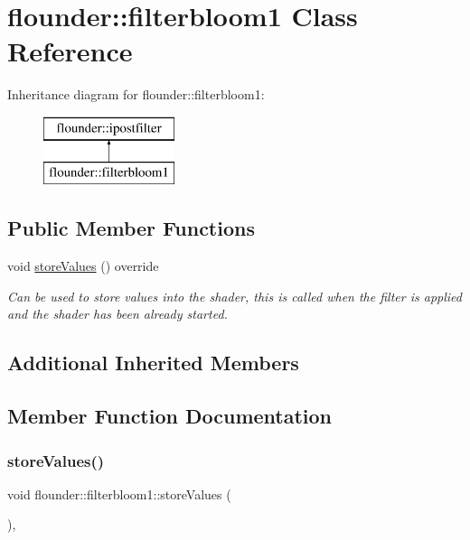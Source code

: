 \hypertarget{classflounder_1_1filterbloom1}{}\section{flounder\+:\+:filterbloom1 Class Reference}
\label{classflounder_1_1filterbloom1}
Inheritance diagram for flounder\+:\+:filterbloom1\+:\begin{figure}[H]
\begin{center}
\leavevmode
\includegraphics[height=2.000000cm]{classflounder_1_1filterbloom1}
\end{center}
\end{figure}
\subsection*{Public Member Functions}
\begin{DoxyCompactItemize}
\item 
void \hyperlink{classflounder_1_1filterbloom1_adfa3f732b13f449745418bf9bd539f79}{store\+Values} () override
\begin{DoxyCompactList}\small\item\em Can be used to store values into the shader, this is called when the filter is applied and the shader has been already started. \end{DoxyCompactList}\end{DoxyCompactItemize}
\subsection*{Additional Inherited Members}


\subsection{Member Function Documentation}
\mbox{\label{classflounder_1_1filterbloom1_adfa3f732b13f449745418bf9bd539f79}} 
\subsubsection{\texorpdfstring{store\+Values()}{storeValues()}}
{\footnotesize\ttfamily void flounder\+::filterbloom1\+::store\+Values (\begin{DoxyParamCaption}{ }\end{DoxyParamCaption})\hspace{0.3cm}{\ttfamily [override]}, {\ttfamily [virtual]}}



